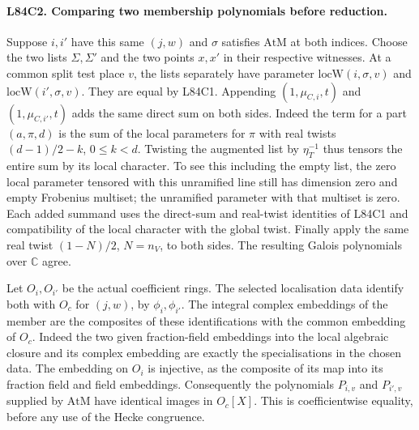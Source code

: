\paragraph{L84C2. Comparing two membership polynomials before reduction.}
Suppose $i,i'$ have this same $(j,w)$ and $\sigma$ satisfies
$\mathrm{AtM}$ at both indices. Choose the two lists $\Sigma,\Sigma'$
and the two points $x,x'$ in their respective witnesses. At a common
split test place $v$, the lists separately have parameter
$\mathrm{locW}(i,\sigma,v)$ and $\mathrm{locW}(i',\sigma,v)$.
They are equal by L84C1. Appending $(1,\mu_{C,i},t)$ and
$(1,\mu_{C,i'},t)$ adds the same direct sum on both sides.
Indeed the term for a part $(a,\pi,d)$ is the sum of the local
parameters for $\pi$ with real twists $(d-1)/2-k$, $0\le k<d$.
Twisting the augmented list by $\eta_T^{-1}$ thus tensors the
entire sum by its local character. To see this including the empty
list, the zero local parameter tensored with this unramified
line still has dimension zero and empty Frobenius multiset;
the unramified parameter with that multiset is zero. Each added
summand uses the direct-sum and real-twist identities of L84C1
and compatibility of the local character with the global twist.
Finally apply the same real twist $(1-N)/2$, $N=n_V$, to both sides.
The resulting Galois polynomials over $\mathbb C$ agree.

Let $O_i,O_{i'}$ be the actual coefficient rings. The selected
localisation data identify both with $O_c$ for $(j,w)$, by
$\phi_i,\phi_{i'}$. The integral complex embeddings of the member
are the composites of these identifications with the common
embedding of $O_c$. Indeed the two given fraction-field embeddings
into the local algebraic closure and its complex embedding are
exactly the specialisations in the chosen data. The embedding on
$O_i$ is injective, as the composite of its map into its fraction
field and field embeddings. Consequently the polynomials $P_{i,v}$
and $P_{i',v}$ supplied by $\mathrm{AtM}$ have identical images in
$O_c[X]$. This is coefficientwise equality, before any use of the
Hecke congruence.


